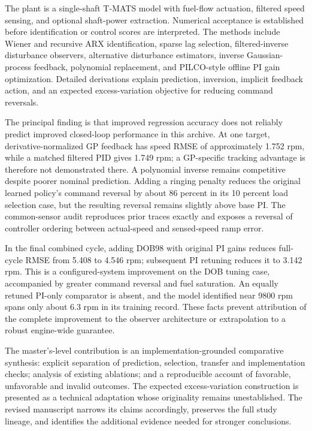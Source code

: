 The plant is a single-shaft T-MATS model with fuel-flow actuation, filtered speed sensing, and optional shaft-power extraction. Numerical acceptance is established before identification or control scores are interpreted. The methods include Wiener and recursive ARX identification, sparse lag selection, filtered-inverse disturbance observers, alternative disturbance estimators, inverse Gaussian-process feedback, polynomial replacement, and PILCO-style offline PI gain optimization. Detailed derivations explain prediction, inversion, implicit feedback action, and an expected excess-variation objective for reducing command reversals.

The principal finding is that improved regression accuracy does not reliably predict improved closed-loop performance in this archive. At one target, derivative-normalized GP feedback has speed RMSE of approximately 1.752 rpm, while a matched filtered PID gives 1.749 rpm; a GP-specific tracking advantage is therefore not demonstrated there. A polynomial inverse remains competitive despite poorer nominal prediction. Adding a ringing penalty reduces the original learned policy's command reversal by about 86 percent in its 10 percent load selection case, but the resulting reversal remains slightly above base PI. The common-sensor audit reproduces prior traces exactly and exposes a reversal of controller ordering between actual-speed and sensed-speed ramp error.

In the final combined cycle, adding DOB98 with original PI gains reduces full-cycle RMSE from 5.408 to 4.546 rpm; subsequent PI retuning reduces it to 3.142 rpm. This is a configured-system improvement on the DOB tuning case, accompanied by greater command reversal and fuel saturation. An equally retuned PI-only comparator is absent, and the model identified near 9800 rpm spans only about 6.3 rpm in its training record. These facts prevent attribution of the complete improvement to the observer architecture or extrapolation to a robust engine-wide guarantee.

The master's-level contribution is an implementation-grounded comparative synthesis: explicit separation of prediction, selection, transfer and implementation checks; analysis of existing ablations; and a reproducible account of favorable, unfavorable and invalid outcomes. The expected excess-variation construction is presented as a technical adaptation whose originality remains unestablished. The revised manuscript narrows its claims accordingly, preserves the full study lineage, and identifies the additional evidence needed for stronger conclusions.

